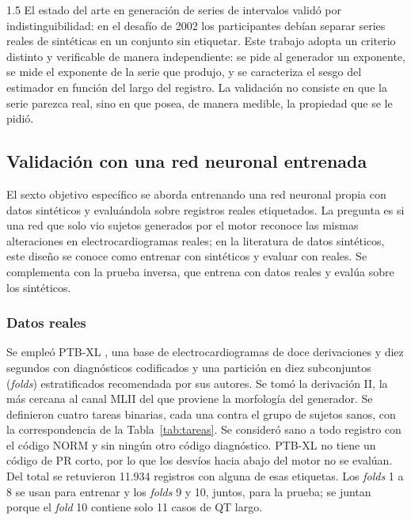 \begin{spacing}{1.5}
El estado del arte en generación de series de intervalos validó por
indistinguibilidad: en el desafío de 2002 \cite{moody2002challenge} los
participantes debían separar series reales de sintéticas en un conjunto sin
etiquetar. Este trabajo adopta un criterio distinto y verificable de manera
independiente: se pide al generador un exponente, se mide el exponente de la
serie que produjo, y se caracteriza el sesgo del estimador en función del largo
del registro. La validación no consiste en que la serie parezca real, sino en que
posea, de manera medible, la propiedad que se le pidió.

\subsection{Validación con una red neuronal entrenada}\label{sec:met_red}

El sexto objetivo específico se aborda entrenando una red neuronal propia con datos sintéticos y evaluándola sobre registros reales etiquetados. La pregunta es si una red que solo vio sujetos generados por el motor reconoce las mismas alteraciones en electrocardiogramas reales; en la literatura de datos sintéticos, este diseño se conoce como entrenar con sintéticos y evaluar con reales. Se complementa con la prueba inversa, que entrena con datos reales y evalúa sobre los sintéticos.

\subsubsection{Datos reales}

Se empleó PTB-XL \cite{wagner2020ptbxl}, una base de electrocardiogramas de doce derivaciones y diez segundos con diagnósticos codificados y una partición en diez subconjuntos (\emph{folds}) estratificados recomendada por sus autores. Se tomó la derivación II, la más cercana al canal MLII del que proviene la morfología del generador. Se definieron cuatro tareas binarias, cada una contra el grupo de sujetos sanos, con la correspondencia de la Tabla~\ref{tab:tareas}. Se consideró sano a todo registro con el código NORM y sin ningún otro código diagnóstico. PTB-XL no tiene un código de PR corto, por lo que los desvíos hacia abajo del motor no se evalúan. Del total se retuvieron 11.934 registros con alguna de esas etiquetas. Los \emph{folds} 1 a 8 se usan para entrenar y los \emph{folds} 9 y 10, juntos, para la prueba; se juntan porque el \emph{fold} 10 contiene solo 11 casos de QT largo.


\end{spacing}

